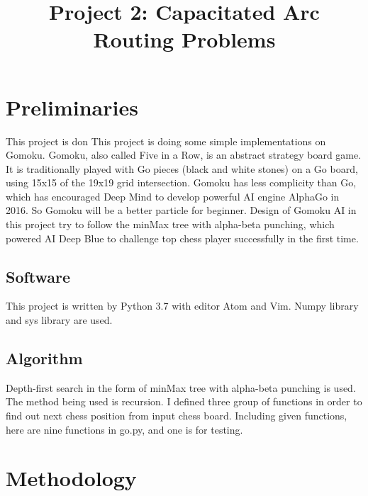 \documentclass[conference,compsoc]{IEEEtran}
\begin{document}
\title{Project 2: Capacitated Arc Routing Problems }

\author{
}

\maketitle

\IEEEpeerreviewmaketitle

\section{Preliminaries}
This project is don 
This project is doing some simple implementations on Gomoku. Gomoku, also called 
Five in a Row, is an abstract strategy board game. It is traditionally played 
with Go pieces (black and white stones) on a Go board, using 15x15 of the 19x19
grid intersection.\cite{1} Gomoku has less complicity than Go, which has encouraged
Deep Mind to develop powerful AI engine AlphaGo in 2016. So Gomoku will be a
better particle for beginner. Design of Gomoku AI in this project try to
follow the minMax tree with alpha-beta punching, which powered AI Deep Blue to
challenge top chess player successfully in the first time.

\subsection{Software}
This project is written by Python 3.7 with editor Atom and Vim. Numpy library
and sys library are used.


\subsection{Algorithm}
Depth-first search in the form of minMax tree with alpha-beta punching is used.
The method being used is recursion. I defined three group of functions in order
to find out next chess position from input chess board. Including given
functions, here are nine functions in go.py, and one is for testing.

\section{Methodology}
\end{document}
